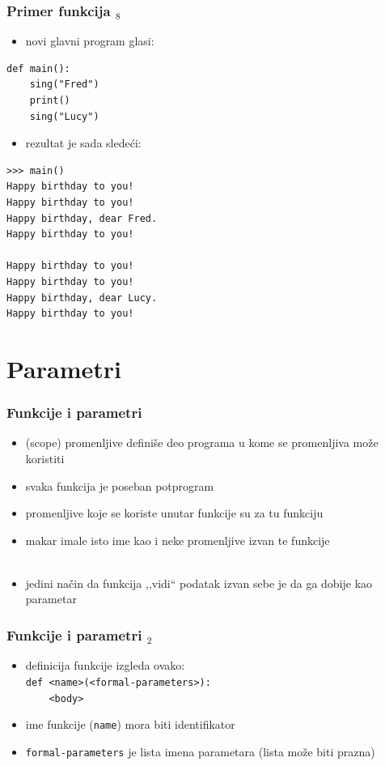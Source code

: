 \documentclass[compress]{beamer}
\begin{document}
\begin{frame}[fragile,shrink=10]
  \frametitle{Primer funkcija $_8$}
  \begin{itemize}
    \item novi glavni program glasi:
  \end{itemize}
\begin{verbatim}
def main():
    sing("Fred")
    print()
    sing("Lucy")
\end{verbatim}
  \begin{itemize}
    \item rezultat je sada sledeći:
  \end{itemize}
\begin{verbatim}
>>> main()
Happy birthday to you!
Happy birthday to you!
Happy birthday, dear Fred.
Happy birthday to you!

Happy birthday to you!
Happy birthday to you!
Happy birthday, dear Lucy.
Happy birthday to you!
\end{verbatim}
\end{frame}

\section{Parametri}

\begin{frame}[fragile]
  \frametitle{Funkcije i parametri}
  \begin{itemize}
    \item {} (scope) promenljive definiše deo programa u kome se promenljiva može koristiti
    \item svaka funkcija je poseban potprogram
    \item promenljive koje se koriste unutar funkcije su  za tu funkciju
    \item makar imale isto ime kao i neke promenljive izvan te funkcije \\ \ \\
    \item jedini način da funkcija ,,vidi`` podatak izvan sebe je da ga dobije kao parametar
  \end{itemize}
\end{frame}

\begin{frame}[fragile]
  \frametitle{Funkcije i parametri $_2$}
  \begin{itemize}
    \item definicija funkcije izgleda ovako: \\
      \texttt{def <name>(<formal-parameters>):} \\
      \texttt{\ \ \ \ <body>}
    \item ime funkcije (\texttt{name}) mora biti identifikator
    \item \texttt{formal-parameters} je lista imena parametara (lista može biti prazna)
  \end{itemize}
\end{frame}
\end{document}
